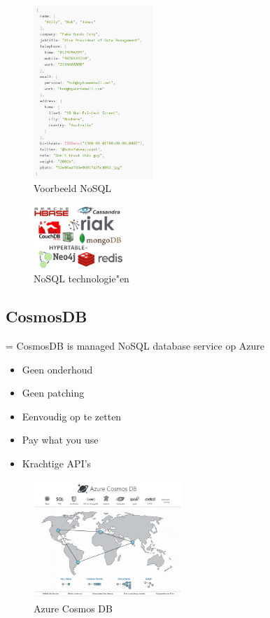 \documentclass{article}
\begin{document}
\begin{figure}[H]
    \centering
    \includegraphics[width=0.4\textwidth]{nosql.png}
    \caption{Voorbeeld NoSQL}
\end{figure}

\begin{figure}[H]
    \centering
    \includegraphics[width=0.3\textwidth]{nosql-techs.png}
    \caption{NoSQL technologie"en}
\end{figure}

\subsection{CosmosDB}

= CosmosDB is managed NoSQL database service op Azure

\begin{itemize}
    \item Geen onderhoud
    \item Geen patching
    \item Eenvoudig op te zetten
    \item Pay what you use
    \item Krachtige API's
\end{itemize}

\begin{figure}[H]
    \centering
    \includegraphics[width=0.5\textwidth]{cosmosdb.png}
    \caption{Azure Cosmos DB}
\end{figure}
\end{document}
